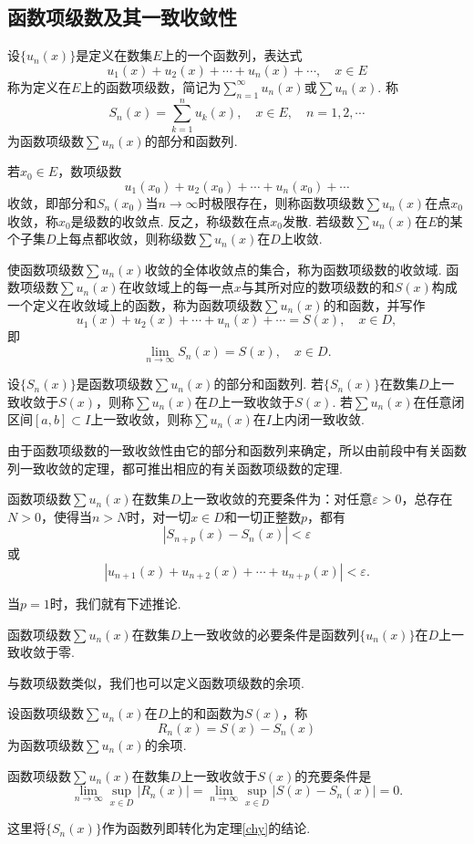 \subsection{函数项级数及其一致收敛性}
\begin{definition}[函数项级数]
	设$\{u_n(x)\}$是定义在数集$E$上的一个函数列，表达式
	$$u_1(x)+u_2(x)+\cdots+u_n(x)+\cdots,\quad x\in E$$
	称为定义在$E$上的{\heiti 函数项级数}，简记为$\displaystyle\sum_{n=1}^{\infty}u_n(x)$或$\sum u_n(x)$. 称
	$$S_n(x)=\sum_{k=1}^{n}u_k(x),\quad x\in E,\quad n=1,2,\cdots$$
	为函数项级数$\sum u_n(x)$的{\heiti 部分和函数列}.
\end{definition}
\begin{definition}[函数项级数的收敛]
	若$x_0\in E$，数项级数
	$$u_1(x_0)+u_2(x_0)+\cdots+u_n(x_0)+\cdots$$
	收敛，即部分和$S_n(x_0)$当$n\to\infty$时极限存在，则称函数项级数$\sum u_n(x)$在点$x_0${\heiti 收敛}，称$x_0$是级数的{\heiti 收敛点}. 反之，称级数在点$x_0${\heiti 发散}. 若级数$\sum u_n(x)$在$E$的某个子集$D$上每点都收敛，则称级数$\sum u_n(x)$在$D$上收敛. 
	
	使函数项级数$\sum u_n(x)$收敛的全体收敛点的集合，称为函数项级数的{\heiti 收敛域}. 函数项级数$\sum u_n(x)$在收敛域上的每一点$x$与其所对应的数项级数的和$S(x)$构成一个定义在收敛域上的函数，称为函数项级数$\sum u_n(x)$的{\heiti 和函数}，并写作
	$$u_1(x)+u_2(x)+\cdots+u_n(x)+\cdots=S(x),\quad x\in D,$$
	即
	$$\lim\limits_{n\to\infty}S_n(x)=S(x),\quad x\in D.$$
\end{definition}
\begin{definition}
	设$\{S_n(x)\}$是函数项级数$\sum u_n(x)$的部分和函数列. 若$\{S_n(x)\}$在数集$D$上一致收敛于$S(x)$，则称$\sum u_n(x)$在$D$上一致收敛于$S(x)$. 若$\sum u_n(x)$在任意闭区间$\left[a,b\right]\subset I$上一致收敛，则称$\sum u_n(x)$在$I$上{\heiti 内闭一致收敛}.
\end{definition}
由于函数项级数的一致收敛性由它的部分和函数列来确定，所以由前段中有关函数列一致收敛的定理，都可推出相应的有关函数项级数的定理.
\begin{theorem}[一致收敛的Cauchy准则]
	函数项级数$\sum u_n(x)$在数集$D$上一致收敛的充要条件为：对任意$\varepsilon>0$，总存在$N>0$，使得当$n>N$时，对一切$x\in D$和一切正整数$p$，都有
	$$|S_{n+p}(x)-S_n(x)|<\varepsilon$$
	或
	$$|u_{n+1}(x)+u_{n+2}(x)+\cdots+u_{n+p}(x)|<\varepsilon.$$
\end{theorem}
当$p=1$时，我们就有下述推论.
\begin{corollary}
	函数项级数$\sum u_n(x)$在数集$D$上一致收敛的必要条件是函数列$\{u_n(x)\}$在$D$上一致收敛于零.
\end{corollary}
与数项级数类似，我们也可以定义函数项级数的余项.
\begin{definition}[余项]
	设函数项级数$\sum u_n(x)$在$D$上的和函数为$S(x)$，称
	$$R_n(x)=S(x)-S_n(x)$$
	为函数项级数$\sum u_n(x)$的{\heiti 余项}.
\end{definition}
\begin{theorem}
	函数项级数$\sum u_n(x)$在数集$D$上一致收敛于$S(x)$的充要条件是
	$$\lim\limits_{n\to\infty}\sup\limits_{x\in D}|R_n(x)|=\lim\limits_{n\to\infty}\sup\limits_{x\in D}|S(x)-S_n(x)|=0.$$
\end{theorem}
\begin{remark}
	这里将$\{S_n(x)\}$作为函数列即转化为定理\ref{chy}的结论.
\end{remark}
